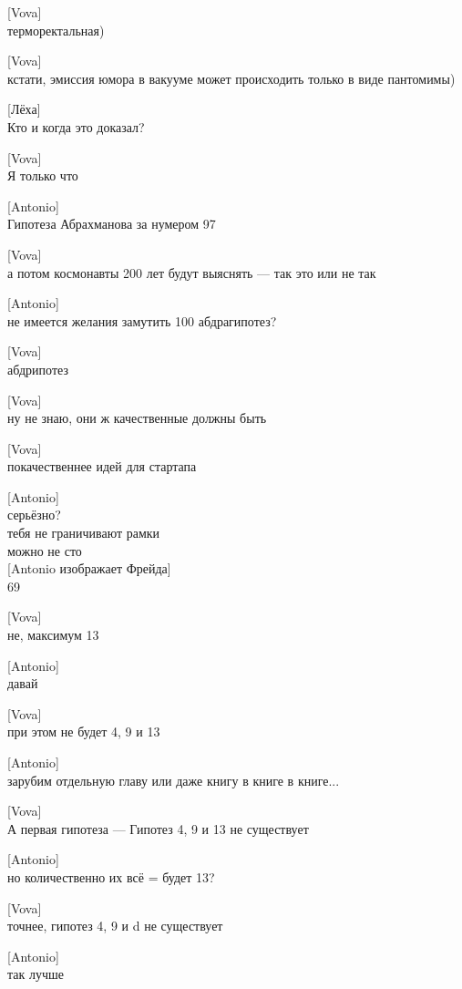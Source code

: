 [Vova]\\
терморектальная)


[Vova]\\
кстати, эмиссия юмора в вакууме может происходить только в виде пантомимы)


[Лёха]\\
Кто и когда это доказал?


[Vova]\\
Я только что


[Antonio]\\
Гипотеза Абрахманова за нумером 97


[Vova]\\
а потом космонавты 200 лет будут выяснять — так это или не так


[Antonio]\\
не имеется желания замутить 100 абдрагипотез?


[Vova]\\
абдрипотез


[Vova]\\
ну не знаю, они ж качественные должны быть


[Vova]\\
покачественнее идей для стартапа


[Antonio]\\
серьёзно?\\
тебя не граничивают рамки\\
можно не сто\\


[Antonio изображает Фрейда]\\
69


[Vova]\\
не, максимум 13


[Antonio]\\
давай


[Vova]\\
при этом не будет 4, 9 и 13


[Antonio]\\
зарубим отдельную главу
или даже книгу в книге в книге...


[Vova]\\
А первая гипотеза — Гипотез 4, 9 и 13 не существует


[Antonio]\\
но количественно их всё = будет 13?


[Vova]\\
точнее, гипотез 4, 9  и d не существует


[Antonio]\\
так лучше


